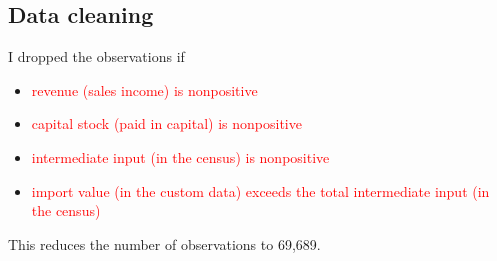 \documentclass[11pt,letter]{article}
\begin{document}
\begin{appendices}
%
%
% 


\subsection{Data cleaning}

I dropped the observations if

\begin{itemize}
\item \textcolor{red}{revenue (sales income) is nonpositive}
\item \textcolor{red}{capital stock (paid in capital) is nonpositive}
\item \textcolor{red}{intermediate input (in the census) is nonpositive}
\item \textcolor{red}{import value (in the custom data) exceeds the total intermediate input (in the census)} %
\end{itemize}

\noindent This reduces the number of observations to 69,689.


\end{appendices}
\end{document}

